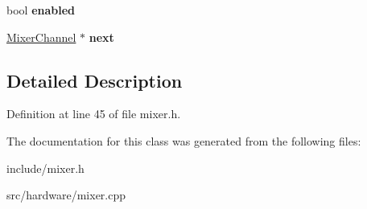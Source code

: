 \begin{DoxyCompactItemize}
\item 
\hypertarget{classMixerChannel_a6965dc347d972ecf8c16bd3c887ea4e5}{bool {\bfseries enabled}}\label{classMixerChannel_a6965dc347d972ecf8c16bd3c887ea4e5}

\item 
\hypertarget{classMixerChannel_aca4b0ddbd84d2e415970c205fdd00e07}{\hyperlink{classMixerChannel}{Mixer\-Channel} $\ast$ {\bfseries next}}\label{classMixerChannel_aca4b0ddbd84d2e415970c205fdd00e07}

\end{DoxyCompactItemize}


\subsection{Detailed Description}


Definition at line 45 of file mixer.\-h.



The documentation for this class was generated from the following files\-:\begin{DoxyCompactItemize}
\item 
include/mixer.\-h\item 
src/hardware/mixer.\-cpp\end{DoxyCompactItemize}
